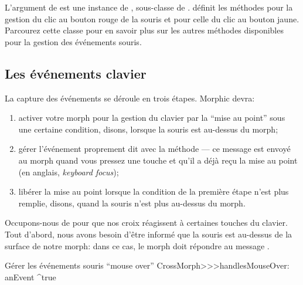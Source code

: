 \documentclass[a4paper,10pt,twoside]{book}
\begin{document}
L'argument  de  est une instance de
\mbox{,} sous-classe de .
 définit les méthodes
 pour la gestion du clic au
bouton rouge de la souris et 
pour celle du clic au bouton jaune. Parcourez cette classe pour
en savoir plus sur les autres méthodes disponibles pour la gestion
des événements souris.

\subsection{Les événements clavier}

La capture des événements  se déroule en trois
étapes. Morphic devra:


\begin{enumerate}
	\item activer votre morph pour la gestion du clavier par la ``mise
      au point'' sous une certaine condition, disons, lorsque la souris est au-dessus du morph; 
	\item gérer l'événement proprement dit avec la méthode
       --- ce message est envoyé au
      morph quand vous pressez une touche et qu'il a déjà reçu
      la mise au point  (en anglais, \emph{keyboard focus});
	\item libérer la mise au point lorsque la condition de la
      première étape n'est plus remplie, disons, quand la souris
      n'est plus au-dessus du morph.
\end{enumerate}

Occupons-nous de  pour que nos croix réagissent à
certaines touches du clavier. Tout d'abord, nous avons besoin d'être
informé que la souris est au-dessus de la surface de notre morph:
dans ce cas, le morph doit répondre  au message
.


\begin{method}{Gérer les événements souris ``mouse over''} 
CrossMorph>>>handlesMouseOver: anEvent
	^true
\end{method}
\end{document}
